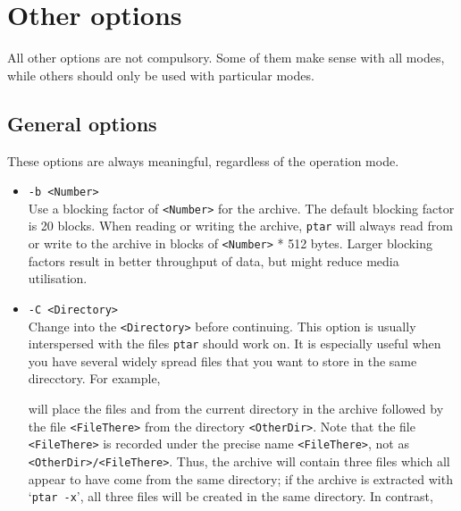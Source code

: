 \section{Other options}

All other options are not compulsory. Some of them make sense with all modes,
while others should only be used with particular modes.

\subsection{General options}
These options are always meaningful, regardless of the operation mode.

\begin{itemize}

  \item {\tt -b <Number>} \\
        Use a blocking factor of {\tt <Number>} for the archive. The default 
        blocking factor is 20 blocks. When reading or writing the archive, 
        {\tt ptar} will always read from or write to the archive in blocks of 
        {\tt <Number>} * 512 bytes. Larger blocking factors result in better 
        throughput of data, but might reduce media utilisation.

  \item {\tt -C <Directory>} \\
        Change into the {\tt <Directory>} before continuing. This option is 
        usually interspersed with the files {\tt ptar} should work on. It is 
        especially useful when you have several widely spread files that you 
        want to store in the same direcctory. For example, 


        will place the files {\tt <FileHere1>} and {\tt <FileHere2>} from the 
        current directory in the archive followed by the file 
        {\tt <FileThere>} from the directory {\tt <OtherDir>}. Note that the 
        file {\tt <FileThere>} is recorded under the precise name 
        {\tt <FileThere>}, not as {\tt <OtherDir>/<FileThere>}. Thus, the 
        archive will contain three files which all appear to have come from 
        the same directory; if the archive is extracted with `{\tt ptar -x}',
        all three files will be created in the same directory. In contrast,



\end{itemize}
